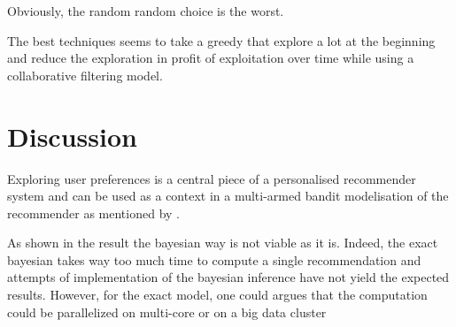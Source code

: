 \documentclass[letterpaper]{article}
\begin{document}
Obviously, the random random choice is the worst.

The best techniques seems to take a greedy that explore a lot at the beginning and reduce the exploration in profit of exploitation over time while using a collaborative filtering model.

\section{Discussion}

Exploring user preferences is a central piece of a personalised recommender system and can be used as a context in a multi-armed bandit modelisation of the recommender as mentioned by \cite{main}.

As shown in the result the bayesian way is not viable as it is. Indeed, the exact bayesian takes way too much time to compute a single recommendation and attempts of implementation of the bayesian inference have not yield the expected results. However, for the exact model, one could argues that the computation could be parallelized on multi-core or on a big data cluster







\end{document}
